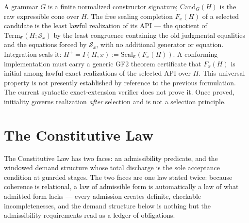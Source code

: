\begin{definition}
A grammar \(G\) is a finite normalized constructor signature;
\(\mathrm{Cand}_G(H)\) is the raw expressible cone over \(H\). The free
sealing completion \(F_x(H)\) of a selected candidate is the least lawful
realization of its API --- the quotient of
\(\mathrm{Term}_{\mathfrak C}(H;\mathcal S_x)\) by the least congruence
containing the old judgmental equalities and the equations forced by
\(\mathcal S_x\), with no additional generator or equation. Integration seals
it: \(H^+ = I(H,x) := \mathrm{Seal}_{\mathfrak C}(F_x(H))\). A conforming
implementation must carry a generic GF2 theorem certificate that
\(F_x(H)\) is initial among lawful exact realizations of the selected API over
\(H\). This universal property is not presently established by reference to
the previous formulation. The current syntactic exact-extension verifier does
not prove it. Once proved, initiality governs realization \emph{after}
selection and is not a selection principle.
\end{definition}

\section{The Constitutive Law}

The Constitutive Law has two faces: an admissibility predicate, and the
windowed demand structure whose total discharge is the sole acceptance
condition at guarded stages. The two faces are one law stated twice: because
coherence is relational, a law of admissible form is automatically a law of
what admitted form lacks --- every admission creates definite, checkable
incompletenesses, and the demand structure below is nothing but the
admissibility requirements read as a ledger of obligations.

